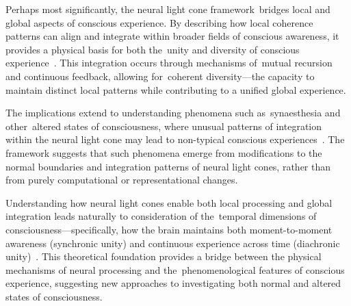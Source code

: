 Perhaps most significantly, the neural light cone framework~bridges local and global aspects of conscious experience. By describing how local coherence patterns can align and integrate within broader fields of conscious awareness, it provides a physical basis for both the~unity and diversity of conscious experience~\cite{da2024mathematical}. This integration occurs through mechanisms of~mutual recursion and continuous feedback, allowing for~coherent diversity—the capacity to maintain distinct local patterns while contributing to a unified global experience.

The implications extend to understanding phenomena such as~synaesthesia and other~altered states of consciousness, where unusual patterns of integration within the neural light cone may lead to non-typical conscious experiences~\cite{hunt2024electromagnetic}. The framework suggests that such phenomena emerge from modifications to the normal boundaries and integration patterns of neural light cones, rather than from purely computational or representational changes.

Understanding how neural light cones enable both local processing and global integration leads naturally to consideration of the~temporal dimensions of consciousness—specifically, how the brain maintains both moment-to-moment awareness (synchronic unity) and continuous experience across time (diachronic unity)~\cite{bosl2025dynamical}. This theoretical foundation provides a bridge between the physical mechanisms of neural processing and the~phenomenological features of conscious experience, suggesting new approaches to investigating both normal and altered states of consciousness.


